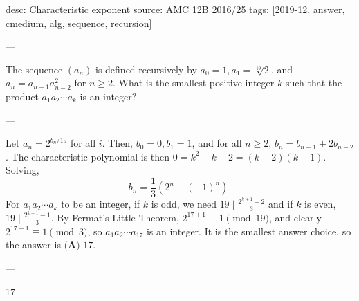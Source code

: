 desc: Characteristic exponent
source: AMC 12B 2016/25
tags: [2019-12, answer, cmedium, alg, sequence, recursion]

---

The sequence $(a_n)$ is defined recursively by $a_0=1,a_1=\sqrt[19]2$, and $a_n=a_{n-1}a_{n-2}^2$ for $n\ge 2$. What is the smallest positive integer $k$ such that the product $a_1a_2\cdots a_k$ is an integer?

---

Let $a_n=2^{b_n/19}$ for all $i$. Then, $b_0=0,b_1=1$, and for all $n\ge 2$, $b_n=b_{n-1}+2b_{n-2}$. The characteristic polynomial is then $0=k^2-k-2=(k-2)(k+1)$. Solving, \[b_n=\frac13\left(2^n-(-1)^n\right).\]
For $a_1a_2\cdots a_k$ to be an integer, if $k$ is odd, we need $19\mid\frac{2^{k+1}-2}3$ and if $k$ is even, $19\mid\frac{2^{k+1}-1}3$. By Fermat's Little Theorem, $2^{17+1}\equiv 1\pmod{19}$, and clearly $2^{17+1}\equiv 1\pmod{3}$, so $a_1a_2\cdots a_{17}$ is an integer. It is the smallest answer choice, so the answer is $\boxed{\textbf{(A) }17}$.

---

17

